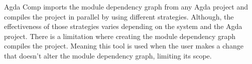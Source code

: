 Agda Comp imports the module dependency graph from any Agda project and
compiles the project in parallel by using different strategies. Although, the
effectiveness of those strategies varies depending on the system and the Agda
project. There is a limitation where creating the module dependency graph
compiles the project. Meaning this tool is used when the user makes a change
that doesn't alter the module dependency graph, limiting its scope.





